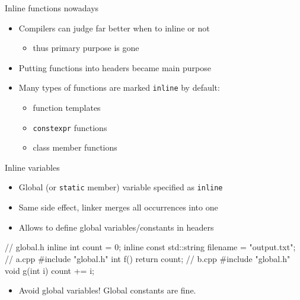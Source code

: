 \begin{frame}[fragile]
  \begin{block}{Inline functions nowadays}
    \begin{itemize}
      \item Compilers can judge far better when to inline or not
        \begin{itemize}
        \item thus primary purpose is gone
        \end{itemize}
      \item Putting functions into headers became main purpose
      \item Many types of functions are marked \texttt{inline} by default:
      \begin{itemize}
        \item function templates
        \item \texttt{constexpr} functions
        \item class member functions
      \end{itemize}
    \end{itemize}
  \end{block}
\end{frame}

\begin{frame}[fragile]
  \begin{block}{Inline variables}
    \begin{itemize}
      \item Global (or \texttt{static} member) variable specified as \texttt{inline}
      \item Same side effect, linker merges all occurrences into one
      \item Allows to define global variables/constants in headers
    \end{itemize}
  \end{block}
  \begin{block}{}
    \small
    \begin{cppcode*}{}
      // global.h
      inline int count = 0;
      inline const std::string filename = "output.txt";
      // a.cpp
      #include "global.h"
      int f() { return count; }
      // b.cpp
      #include "global.h"
      void g(int i) { count += i; }
    \end{cppcode*}
  \end{block}
  \begin{alertblock}{}
    \begin{itemize}
      \item Avoid global variables! Global constants are fine.
    \end{itemize}
  \end{alertblock}
\end{frame}
